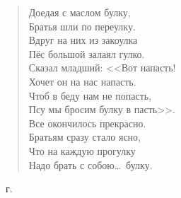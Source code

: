 \begin{verse}
Доедая с маслом булку,\\
Братья шли по переулку.\\
Вдруг на них из закоулка\\
Пёс большой залаял гулко.\\[\medskipamount]
Сказал младший: <<Вот напасть!\\
Хочет он на нас напасть.\\
Чтоб в беду нам не попасть,\\
Псу мы бросим булку в пасть>>.\\[\medskipamount]
Все окончилось прекрасно.\\
Братьям сразу стало ясно,\\
Что на каждую прогулку\\
Надо брать с собою\dots\ булку.
\end{verse}

\medskip
{}~г.